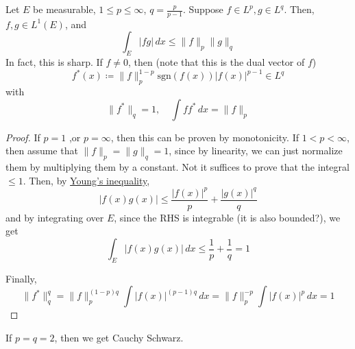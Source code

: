   \begin{theorem}[Holder]
    \label{thm:holder}
    Let $E$ be measurable, $1 \leq p \leq \infty$, $q = \frac{p}{p-1}$. Suppose $f \in L^p, g \in L^q$. Then, $f, g \in L^1 (E)$, and 
    \begin{equation}
      \int_E |fg| \,dx \leq \|f\|_p \|g\|_q
    \end{equation}
    In fact, this is sharp. If $f \neq 0$, then (note that this is the dual vector of $f$)
    \begin{equation}
      f^\ast (x) \coloneqq \|f\|_p^{1 - p} \mathrm{sgn}(f(x)) |f(x)|^{p-1} \in L^q
    \end{equation}
    with 
    \begin{equation}
      \|f^\ast \|_q = 1, \quad \int f f^\ast \,dx = \|f\|_p
    \end{equation}
  \end{theorem}
  \begin{proof}
    If $p =1$ ,or $p = \infty$, then this can be proven by monotonicity. If $1 < p < \infty$, then assume that $\|f\|_p = \|g\|_q = 1$, since by linearity, we can just normalize them by multiplying them by a constant. Not it suffices to prove that the integral $\leq 1$. Then, by \hyperref[thm:youngs-inequality]{Young's inequality},
    \begin{equation}
      |f(x) g(x)| \leq \frac{|f(x)|^p}{p} + \frac{|g(x)|^q}{q}
    \end{equation}
    and by integrating over $E$, since the RHS is integrable (it is also bounded?), we get 
    \begin{equation}
      \int_E |f(x) g(x)| \,dx \leq \frac{1}{p} + \frac{1}{q} = 1
    \end{equation}

    Finally, 
    \begin{equation}
      \|f^\ast\|_q^q = \|f\|_p^{(1-p) q} \int |f(x)|^{(p-1)q} \,dx = \|f\|_p^{-p} \int |f(x)|^p \,dx = 1
    \end{equation}
  \end{proof}

  \begin{corollary}
    \label{thm:cauchy-schwarz}
    If $p = q = 2$, then we get Cauchy Schwarz. 
  \end{corollary}

